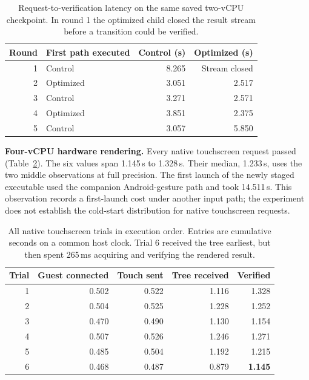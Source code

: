 \documentclass[11pt,letterpaper]{article}
\newcommand{\unit}[1]{#1\,s}
\newcommand{\subhead}[1]{\par\smallskip\noindent\textbf{#1}\enspace}
\begin{document}
\begin{table}[h]
\centering\small
\begin{tabular}{@{}rlrr@{}}
\toprule Round & First path executed & Control (s) & Optimized (s) \\ \midrule
1 & Control   & 8.265 & Stream closed\\
2 & Optimized & 3.051 & 2.517\\
3 & Control   & 3.271 & 2.571\\
4 & Optimized & 3.851 & 2.375\\
5 & Control   & 3.057 & 5.850\\ \bottomrule
\end{tabular}
\caption{Request-to-verification latency on the same saved two-vCPU checkpoint. In round 1 the optimized child closed the result stream before a transition could be verified.}\label{tab:pairs}
\end{table}

\subhead{Four-vCPU hardware rendering.}
Every native touchscreen request passed (Table~\ref{tab:touch}). The six values span \unit{1.145} to \unit{1.328}. Their median, \unit{1.233}, uses the two middle observations at full precision. The first launch of the newly staged executable used the companion Android-gesture path and took \unit{14.511}. This observation records a first-launch cost under another input path; the experiment does not establish the cold-start distribution for native touchscreen requests.

\begin{table}[h]
\centering\small
\begin{tabular}{@{}rrrrr@{}}\toprule
Trial & Guest connected & Touch sent & Tree received & Verified \\ \midrule
1 & 0.502 & 0.522 & 1.116 & 1.328\\
2 & 0.504 & 0.525 & 1.228 & 1.252\\
3 & 0.470 & 0.490 & 1.130 & 1.154\\
4 & 0.507 & 0.526 & 1.246 & 1.271\\
5 & 0.485 & 0.504 & 1.192 & 1.215\\
6 & 0.468 & 0.487 & 0.879 & \textbf{1.145}\\ \bottomrule
\end{tabular}
\caption{All native touchscreen trials in execution order. Entries are cumulative seconds on a common host clock. Trial 6 received the tree earliest, but then spent 265\,ms acquiring and verifying the rendered result.}\label{tab:touch}
\end{table}
\end{document}
